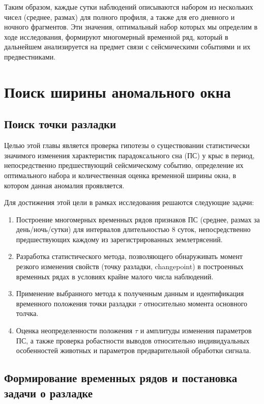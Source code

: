 \documentclass[14pt]{mmcs_article}
\begin{document}
Таким образом, каждые сутки наблюдений описываются набором из нескольких чисел (среднее, размах) для полного профиля, а также для его дневного и ночного фрагментов. Эти значения, оптимальный набор которых мы определим в ходе исследования, формируют многомерный временной ряд, который в дальнейшем анализируется на предмет связи с сейсмическими событиями и их предвестниками. 



\section{Поиск ширины аномального окна}
\subsection*{Поиск точки разладки}


Целью этой главы является проверка гипотезы о существовании статистически значимого изменения характеристик парадоксального сна (ПС) у крыс в период, непосредственно предшествующий сейсмическому событию, определение их оптимального набора и количественная оценка временной ширины окна, в котором данная аномалия проявляется. 

Для достижения этой цели в рамках исследования решаются следующие задачи:
\begin{enumerate}[label=\arabic*.]
	\item Построение многомерных временных рядов признаков ПС (среднее, размах за день/ночь/сутки) для интервалов длительностью 8 суток, непосредственно предшествующих каждому из зарегистрированных землетрясений.
	
	\item Разработка статистического метода, позволяющего обнаруживать момент резкого изменения свойств (точку разладки, changepoint) в построенных временных рядах в условиях крайне малого числа наблюдений.
	
	\item Применение выбранного метода к полученным данным и идентификация временного положения точки разладки $\tau$ относительно момента основного толчка.
	
	\item Оценка неопределенности положения $\tau$ и амплитуды изменения параметров ПС, а также проверка робастности выводов относительно индивидуальных особенностей животных и параметров предварительной обработки сигнала.
\end{enumerate}

\subsection*{Формирование временных рядов и постановка задачи о разладке}
\end{document}
